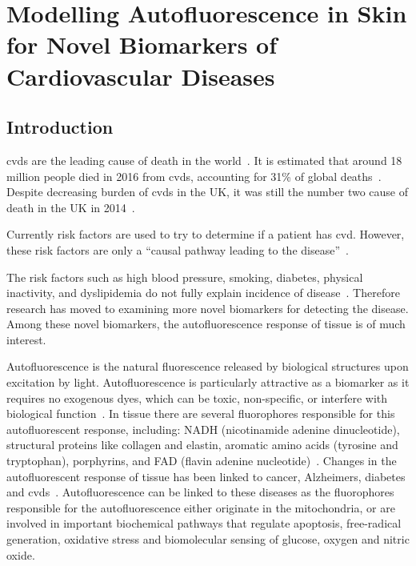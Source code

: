 \chapter{Modelling Autofluorescence in Skin for Novel Biomarkers of Cardiovascular Diseases}
\label{chap:salvo}




\section{Introduction}


\Gls*{cvds} are the leading cause of death in the world~\cite{whodeath}.
It is estimated that around 18 million people died in 2016 from \gls*{cvds}, accounting for 31\% of global deaths~\cite{whodeath}.
Despite decreasing burden of \gls*{cvds} in the UK, it was still the number two cause of death in the UK in 2014~\cite{bhatnagar2016trends}.

Currently risk factors are used to try to determine if a patient has \gls*{cvd}.
However, these risk factors are only a ``causal pathway leading to the disease''~\cite{vasan2006biomarkers}.

The risk factors such as high blood pressure, smoking, diabetes, physical inactivity, and dyslipidemia do not fully explain incidence of disease~\cite{olsen2010assessment,folsom2013classical}.
Therefore research has moved to examining more novel biomarkers for detecting the disease.
Among these novel biomarkers, the autofluorescence response of tissue is of much interest.

Autofluorescence is the natural fluorescence released by biological structures upon excitation by light.
Autofluorescence is particularly attractive as a biomarker as it requires no exogenous dyes, which can be toxic, non-specific, or interfere with biological function~\cite{kollias1998endogenous}.
In tissue there are several fluorophores responsible for this autofluorescent response, including: NADH (nicotinamide adenine dinucleotide), structural proteins like collagen and elastin, aromatic amino acids (tyrosine and tryptophan), porphyrins, and FAD (flavin adenine nucleotide)~\cite{monici2005cell}.
Changes in the autofluorescent response of tissue has been linked to cancer, Alzheimers, diabetes and \gls*{cvds}~\cite{drakaki2009laser,pu2013native,ramanujam2000fluorescence,tarnawska2018pilot,van2019skin}.
Autofluorescence can be linked to these diseases as the fluorophores responsible for the autofluorescence either originate in the mitochondria, or are involved in important biochemical pathways that regulate apoptosis, free-radical generation, oxidative stress and biomolecular sensing of glucose, oxygen and nitric oxide.

